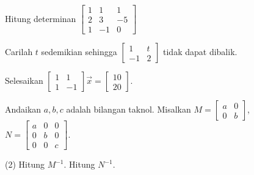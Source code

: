 \setcounter{exercise}{100}

\begin{exercise}
Hitung determinan
$\left[ \begin{smallmatrix}
1 & 1 & 1 \\
2 & 3 & -5 \\
1 & -1 & 0
\end{smallmatrix}\right]$
\end{exercise}

\begin{exercise}
Carilah $t$ sedemikian sehingga
$\left[ \begin{smallmatrix}
1 & t \\
-1 & 2
\end{smallmatrix}\right]$
tidak dapat dibalik.
\end{exercise}

\begin{exercise}
Selesaikan
$\left[ \begin{smallmatrix}
1 & 1 \\
1 & -1
\end{smallmatrix}\right] \vec{x} =
\left[ \begin{smallmatrix}
10 \\ 20
\end{smallmatrix}\right]$.
\end{exercise}

\begin{exercise}
Andaikan $a, b, c$ adalah bilangan taknol.
Misalkan
$M=\left[ \begin{smallmatrix}
a & 0 \\
0 & b
\end{smallmatrix}\right]$,
$N=\left[ \begin{smallmatrix}
a & 0 & 0 \\
0 & b & 0 \\
0 & 0 & c
\end{smallmatrix}\right]$.
\begin{tasks}(2)
\task Hitung $M^{-1}$.
\task Hitung $N^{-1}$.
\end{tasks}
\end{exercise}

